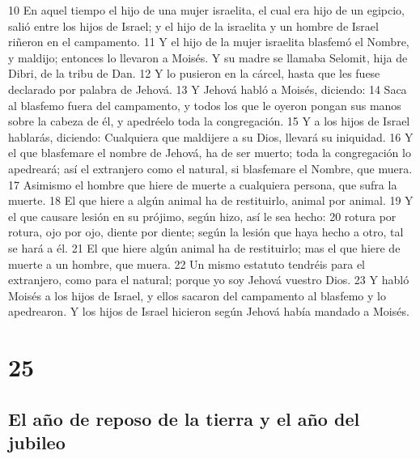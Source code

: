 10 En aquel tiempo el hijo de una mujer israelita, el cual era hijo de un egipcio, salió entre los hijos de Israel; y el hijo de la israelita y un hombre de Israel riñeron en el campamento.
11 Y el hijo de la mujer israelita blasfemó el Nombre, y maldijo; entonces lo llevaron a Moisés. Y su madre se llamaba Selomit, hija de Dibri, de la tribu de Dan.
12 Y lo pusieron en la cárcel, hasta que les fuese declarado por palabra de Jehová.
13 Y Jehová habló a Moisés, diciendo:
14 Saca al blasfemo fuera del campamento, y todos los que le oyeron pongan sus manos sobre la cabeza de él, y apedréelo toda la congregación.
15 Y a los hijos de Israel hablarás, diciendo: Cualquiera que maldijere a su Dios, llevará su iniquidad.
16 Y el que blasfemare el nombre de Jehová, ha de ser muerto; toda la congregación lo apedreará; así el extranjero como el natural, si blasfemare el Nombre, que muera.
17 Asimismo el hombre que hiere de muerte a cualquiera persona, que sufra la muerte.
18 El que hiere a algún animal ha de restituirlo, animal por animal.
19 Y el que causare lesión en su prójimo, según hizo, así le sea hecho:
20 rotura por rotura, ojo por ojo, diente por diente; según la lesión que haya hecho a otro, tal se hará a él.
21 El que hiere algún animal ha de restituirlo; mas el que hiere de muerte a un hombre, que muera.
22 Un mismo estatuto tendréis para el extranjero, como para el natural;  porque yo soy Jehová vuestro Dios.
23 Y habló Moisés a los hijos de Israel, y ellos sacaron del campamento al blasfemo y lo apedrearon. Y los hijos de Israel hicieron según Jehová había mandado a Moisés.  

\chapter{25}

\section{El año de reposo de la tierra y el año del jubileo}


